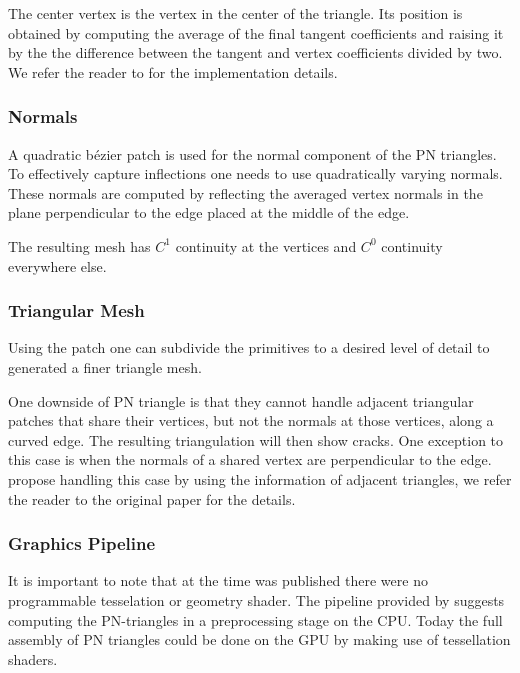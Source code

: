 The center vertex is the vertex in the center of the triangle. Its position is obtained by computing the average of the final tangent coefficients and raising it by the the difference between the tangent and vertex coefficients divided by two. We refer the reader to \textcite{vlachos2001curved} for the implementation details.

\subsubsection*{Normals}
A quadratic b\'ezier patch is used for the normal component of the PN triangles. To effectively capture inflections one needs to use quadratically varying normals. These normals are computed by reflecting the averaged vertex normals in the plane perpendicular to the edge placed at the middle of the edge.

The resulting mesh has $C^1$ continuity at the vertices and $C^0$ continuity everywhere else. 

\subsubsection*{Triangular Mesh}
Using the patch one can subdivide the primitives to a desired level of detail to generated a finer triangle mesh. 

One downside of PN triangle is that they cannot handle adjacent triangular patches that share their vertices, but not the normals at those vertices, along a curved edge. The resulting triangulation will then show cracks. One exception to this case is when the normals of a shared vertex are perpendicular to the edge. \citeauthor{vlachos2001curved} propose handling this case by using the information of adjacent triangles, we refer the reader to the original paper for the details.

\subsubsection*{Graphics Pipeline}
It is important to note that at the time \textcite{vlachos2001curved} was published there were no programmable tesselation or geometry shader. The pipeline provided by \citeauthor{vlachos2001curved} suggests computing the PN-triangles in a preprocessing stage on the CPU. Today the full assembly of PN triangles could be done on the GPU by making use of tessellation shaders.\\

